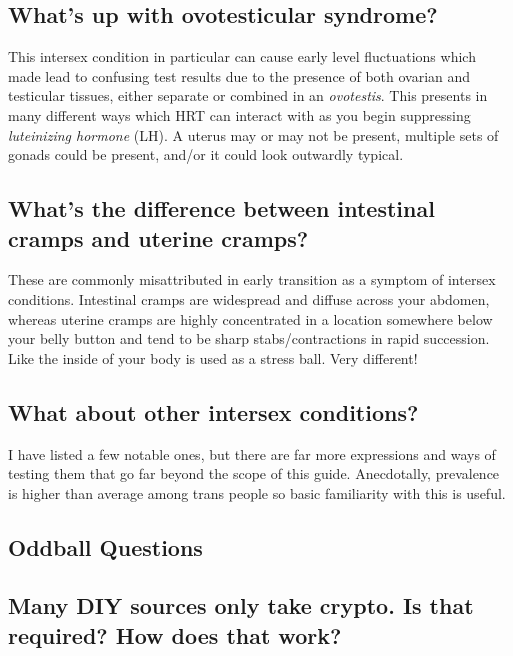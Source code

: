 \documentclass{article}
\begin{document}
{{\subsection{What's up with ovotesticular syndrome?}

This intersex condition in particular can cause early level fluctuations which made lead to confusing test results due to the presence of both ovarian and testicular tissues, either separate or combined in an \textit{ovotestis}. This presents in many different ways which HRT can interact with as you begin suppressing \textit{luteinizing hormone} (LH). A uterus may or may not be present, multiple sets of gonads could be present, and/or it could look outwardly typical.

\subsection{What’s the difference between intestinal cramps and uterine cramps?}\label{11-35}

These are commonly misattributed in early transition as a symptom of intersex conditions. Intestinal cramps are widespread and diffuse across your abdomen, whereas uterine cramps are highly concentrated in a location somewhere below your belly button and tend to be sharp stabs/contractions in rapid succession. Like the inside of your body is used as a stress ball. Very different!

\subsection{What about other intersex conditions?}

I have listed a few notable ones, but there are far more expressions and ways of testing them that go far beyond the scope of this guide. Anecdotally, prevalence is higher than average among trans people so basic familiarity with this is useful.

\subsection*{Oddball Questions}

\subsection{Many DIY sources only take crypto. Is that required? How does that work?}

}}
\end{document}
